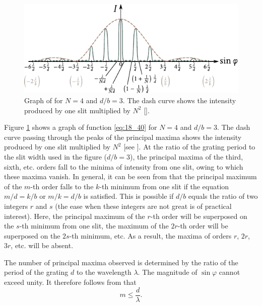 \begin{figure}[!htb]
	\begin{center}
		\includegraphics[scale=1.1]{figures/ch_18/fig_18_34.pdf}
        \caption[]{Graph of  for $N=4$ and $d/b=3$. The dash curve shows the intensity produced by one slit multiplied by $N^2$ [].}
		\label{fig:18_34}
	\end{center}
	\vspace{-0.8cm}
\end{figure}

Figure \ref{fig:18_34} shows a graph of function \eqref{eq:18_40} for $N=4$ and $d/b=3$.
The dash curve passing through the peaks of the principal maxima shows the intensity produced by one slit multiplied by $N^2$ [see ].
At the ratio of the grating period to the slit width used in the figure ($d/b=3$), the principal maxima of the third, sixth, etc. orders fall to the minima of intensity from one slit, owing to which these maxima vanish.
In general, it can be seen from  that the principal maximum of the $m$-th order falls to the $k$-th minimum from one slit if the equation $m/d = k/b$ or $m/k = d/b$ is satisfied.
This is possible if $d/b$ equals the ratio of two integers $r$ and $s$ (the ease when these integers are not great is of practical interest).
Here, the principal maximum of the $r$-th order will be superposed on the $s$-th minimum from one slit, the maximum of the $2r$-th order will be superposed on the $2s$-th minimum, etc.
As a result, the maxima of orders $r$, $2r$, $3r$, etc. will be absent.

The number of principal maxima observed is determined by the ratio of the period of the grating $d$ to the wavelength $\lambda$.
The magnitude of $\sin\varphi$ cannot exceed unity.
It therefore follows from  that
\begin{equation}\label{eq:18_45}
	m \leqslant \frac{d}{\lambda}.
\end{equation}

